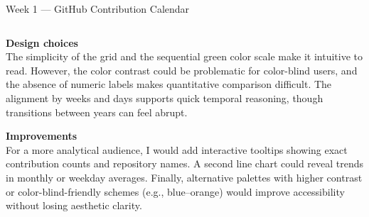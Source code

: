 \documentclass[aspectratio=169]{beamer}
\begin{document}
\begin{frame}{Week 1 — GitHub Contribution Calendar}
\begin{columns}[T,onlytextwidth]
\begin{column}{0.52\textwidth}
    \vspace{2mm}
    \textbf{Design choices}\\
    The simplicity of the grid and the sequential green color scale make it intuitive to read. However, the color contrast could be problematic for color-blind users, and the absence of numeric labels makes quantitative comparison difficult. The alignment by weeks and days supports quick temporal reasoning, though transitions between years can feel abrupt.

    \vspace{2mm}
    \textbf{Improvements}\\
    For a more analytical audience, I would add interactive tooltips showing exact contribution counts and repository names. A second line chart could reveal trends in monthly or weekday averages. Finally, alternative palettes with higher contrast or color-blind-friendly schemes (e.g., blue–orange) would improve accessibility without losing aesthetic clarity.
  \end{column}
\end{columns}
\end{frame}



    
\end{document}
